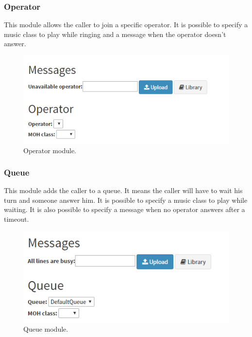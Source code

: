 \subsubsection{Operator}
This module allows the caller to join a specific operator. It is possible to specify a music class to play while ringing and a message when the operator doesn't answer.

\begin{figure}[H]
  \caption{Operator module.}
  \centering
    \includegraphics[width=1\textwidth]{img/operator.png}
\end{figure}



\subsubsection{Queue}
This module adds the caller to a queue. It means the caller will have to wait his turn and someone answer him. It is possible to specify a music class to play while waiting. It is also possible to specify a message when no operator answers after a timeout.

\begin{figure}[H]
  \caption{Queue module.}
  \centering
    \includegraphics[width=1\textwidth]{img/queue.png}
\end{figure}



